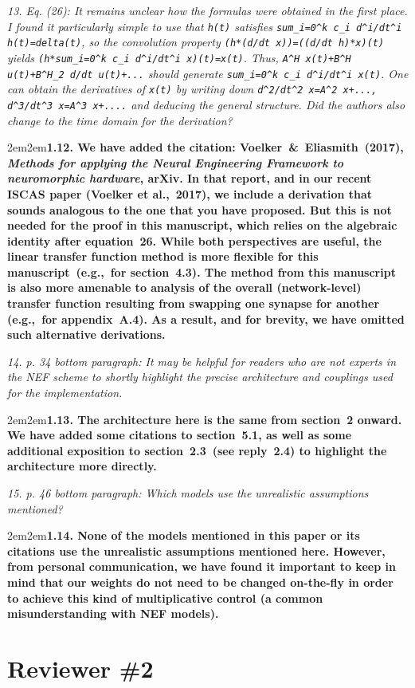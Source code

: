 \documentclass[a4paper]{article}
\newcommand{\newl}{\par\null\par}
\newcommand{\REVIEW}[1]{{\it #1}}
\newcommand{\REPLY}[1]{\newl\begin{adjustwidth}{2em}{2em}{\bf #1}\end{adjustwidth}\newl}
\begin{document}
{\it 13. Eq. (26): It remains unclear how the formulas were obtained in the first place. I found it particularly simple to use that \verb|h(t)| satisfies \verb|sum_i=0^k c_i d^i/dt^i h(t)=delta(t)|, so the convolution property \verb|(h*(d/dt x))=((d/dt h)*x)(t)| yields \verb|(h*sum_i=0^k c_i d^i/dt^i x)(t)=x(t)|. Thus, \verb|A^H x(t)+B^H u(t)+B^H_2 d/dt u(t)+...| should generate \verb|sum_i=0^k c_i d^i/dt^i x(t)|. One can obtain the derivatives of \verb|x(t)| by writing down \verb|d^2/dt^2 x=A^2 x+..., d^3/dt^3 x=A^3 x+....| and deducing the general structure. Did the authors also change to the time domain for the derivation?}

\REPLY{1.12. We have added the citation: Voelker~\&~Eliasmith~(2017), \textit{Methods for applying the Neural Engineering Framework to neuromorphic hardware}, arXiv.
In that report, and in our recent ISCAS paper (Voelker et al.,~2017), we include a derivation that sounds analogous to the one that you have proposed.
But this is not needed for the proof in this manuscript, which relies on the algebraic identity after equation~26.
While both perspectives are useful, the linear transfer function method is more flexible for this manuscript~(e.g.,~for section~4.3).
The method from this manuscript is also more amenable to analysis of the overall (network-level) transfer function resulting from swapping one synapse for another (e.g.,~for appendix~A.4).
As a result, and for brevity, we have omitted such alternative derivations.}

\REVIEW{14. p. 34 bottom paragraph: It may be helpful for readers who are not experts in the NEF scheme to shortly highlight the precise architecture and couplings used for the implementation.}

\REPLY{1.13. The architecture here is the same from section~2 onward.
We have added some citations to section~5.1, as well as some additional exposition to section~2.3~(see reply~2.4) to highlight the architecture more directly.}

\REVIEW{15. p. 46 bottom paragraph: Which models use the unrealistic assumptions mentioned?}

\REPLY{1.14. None of the models mentioned in this paper or its citations use the unrealistic assumptions mentioned here.
However, from personal communication, we have found it important to keep in mind that our weights do not need to be changed on-the-fly in order to achieve this kind of multiplicative control (a common misunderstanding with NEF models).}

\section*{Reviewer \#2}
\end{document}
